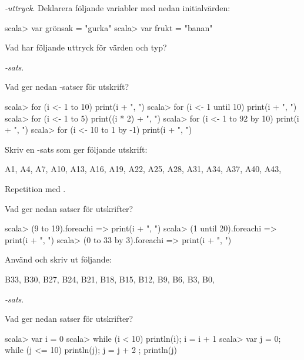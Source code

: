 {{{{\Task {}\textit{-uttryck}. Deklarera följande variabler med nedan initialvärden:

\begin{REPLnonum}
scala> var grönsak = "gurka"
scala> var frukt = "banan"
\end{REPLnonum}

Vad har följande uttryck för värden och typ?

\Subtask {}

\Subtask {}

\Subtask {}

\Subtask {}

\Subtask {}


\Task {}\textit{-sats}.

\Subtask Vad ger nedan -satser för utskrift?

\begin{REPL}
scala> for (i <- 1 to 10) print(i + ", ")
scala> for (i <- 1 until 10) print(i + ", ")
scala> for (i <- 1 to 5) print((i * 2) + ", ")
scala> for (i <- 1 to 92 by 10) print(i + ", ")
scala> for (i <- 10 to 1 by -1) print(i + ", ")
\end{REPL}

\Subtask Skriv en -sats som ger följande utskrift:
\begin{REPLnonum}
A1, A4, A7, A10, A13, A16, A19, A22, A25, A28, A31, A34, A37, A40, A43, 
\end{REPLnonum}

\Task Repetition med .

\Subtask Vad ger nedan satser för utskrifter?

\begin{REPL}
scala> (9 to 19).foreach{i => print(i + ", ")}
scala> (1 until 20).foreach{i => print(i + ", ")}
scala> (0 to 33 by 3).foreach{i => print(i + ", ")}
\end{REPL}

\Subtask Använd  och skriv ut följande:
\begin{REPLnonum}
B33, B30, B27, B24, B21, B18, B15, B12, B9, B6, B3, B0, 
\end{REPLnonum}

\Task {}\textit{-sats}. 

\Subtask Vad ger nedan satser för utskrifter?
\begin{REPL}
scala> var i = 0
scala> while (i < 10) { println(i); i = i + 1 }
scala> var j = 0; while (j <= 10) { println(j); j = j + 2 }; println(j)
\end{REPL}

}}}}
